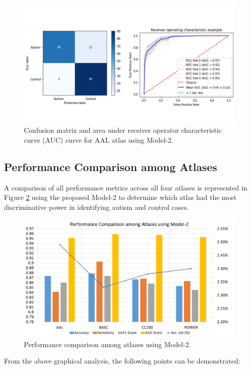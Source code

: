\begin{figure}[h!]
\centering
\includegraphics[width=\linewidth]{figures/Figure 4.8.png}
\caption{Confusion matrix and area under receiver operator characteristic curve (AUC) curve for AAL atlas using Model-2.}
\label{fig:4.5}
\end{figure}

\subsection{Performance Comparison among Atlases}
A comparison of all performance metrics across all four atlases is represented in Figure \ref{fig:4.9} using the proposed Model-2 to determine which atlas had the most discriminative power in identifying autism and control cases.

\begin{figure}[h!]
\centering
\includegraphics[width=\linewidth]{figures/Figure 4.9.png}
\caption{Performance comparison among atlases using Model-2.}
\label{fig:4.9}
\end{figure}

From the above graphical analysis, the following points can be demonstrated:\\

